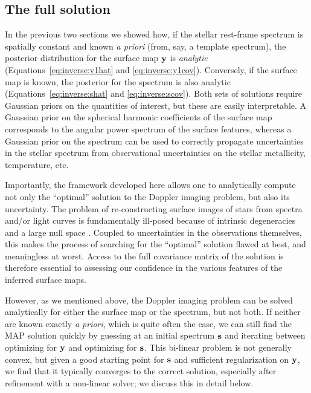 \documentclass[modern]{aastex62}
\begin{document}
\subsection{The full solution}
\label{sec:full_solve}
In the previous two sections we showed how, if the stellar
rest-frame spectrum is spatially constant and known \emph{a priori} 
(from, say, a template spectrum), the posterior distribution
for the surface map ${\mathbf{y}}$ is \emph{analytic} 
(Equations~\ref{eq:inverse:y1hat}
and \ref{eq:inverse:y1cov}). Conversely, if the surface map is known,
the posterior for the spectrum is also analytic 
(Equations~\ref{eq:inverse:shat} and \ref{eq:inverse:scov}). Both sets of
solutions require Gaussian priors on the quantities of interest, but these
are easily interpretable. A Gaussian prior on
the spherical harmonic coefficients of the surface map corresponds 
to the angular power spectrum of the surface features, whereas a Gaussian
prior on the spectrum can be used to correctly propagate uncertainties in
the stellar spectrum from observational uncertainties on the stellar
metallicity, temperature, etc.

Importantly, the framework developed here allows one to analytically
compute not only the ``optimal'' solution to the Doppler imaging problem,
but also its uncertainty. The problem of re-constructing surface images
of stars from spectra and/or light curves is fundamentally ill-posed because
of intrinsic degeneracies and a large null space
\citep[e.g.,][]{Luger2019} . Coupled to uncertainties in
the observations themselves, this makes the process of searching for the
``optimal'' solution flawed at best, and meaningless at worst. Access to the
full covariance matrix of the solution is therefore essential to assessing our
confidence in the various features of the inferred surface maps.

However, as we mentioned above, the Doppler imaging problem can be solved
analytically for either the surface map or the spectrum, but not both. If
neither are known exactly \emph{a priori}, which is quite often the case,
we can still find the MAP solution quickly by guessing at an initial
spectrum ${\mathbf{s}}$ and iterating between optimizing for ${\mathbf{y}}$ and
optimizing for ${\mathbf{s}}$. This bi-linear problem is not generally convex,
but given a good starting point for ${\mathbf{s}}$ and sufficient regularization
on ${\mathbf{y}}$, we find that it typically converges to the correct solution,
especially after refinement with a non-linear solver;
we discuss this in detail below.
\end{document}
